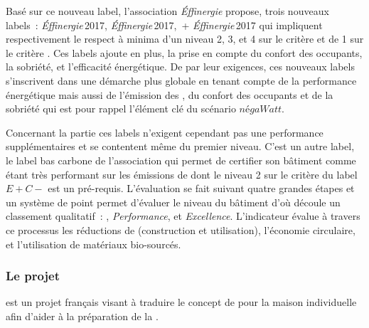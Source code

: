 Basé sur ce nouveau label, l’association \textit{Éffinergie} propose, trois nouveaux
labels~:  \textit{Éffinergie}\,2017,  \textit{Éffinergie}\,2017,
\,+ \textit{Éffinergie}\,2017 qui impliquent respectivement le respect à
minima d’un niveau 2, 3, et 4 sur le critère  et de 1 sur le critère . Ces
labels ajoute en plus, la prise en compte du confort des occupants, la sobriété, et
l’efficacité énergétique. De par leur exigences, ces nouveaux labels s’inscrivent dans une
démarche plus globale en tenant compte de la performance énergétique mais aussi de
l’émission des , du confort des occupants et de la sobriété qui est pour rappel
l’élément clé du scénario $négaWatt$.

Concernant la partie  ces labels n’exigent cependant pas une performance
supplémentaires et se contentent même du premier niveau. C’est un autre label, le label
bas carbone de l’association
 qui permet de
certifier son bâtiment comme étant très performant sur les émissions de  dont le
niveau 2 sur le critère  du label $E+C-$ est un pré-requis. L’évaluation se fait
suivant quatre grandes étapes et un système de point permet d’évaluer le niveau du
bâtiment d’où découle un classement qualitatif~: , 
\textit{Performance}, et  \textit{Excellence}. L’indicateur évalue à travers ce
processus les réductions de  (construction et utilisation), l’économie
circulaire, et l’utilisation de matériaux bio-sourcés.


\subsubsection{Le projet } %
\label{ssub:le_projet_comepos}
 est un projet français visant à traduire le concept de 
pour la maison individuelle afin d’aider à la préparation de la .


